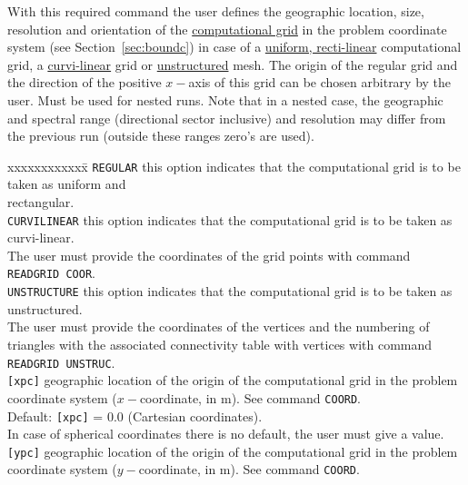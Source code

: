 \documentclass[12pt]{book}
\begin{document}
\noindent
With this required command the user defines the geographic location, size, resolution and orientation of
the \underline{computational grid} in the problem coordinate system (see Section~\ref{sec:boundc}) in
case of a \underline{uniform, recti-linear} computational grid, a \underline{curvi-linear} grid or
\underline{unstructured} mesh.
The origin of the regular grid and the direction of the positive $x-$axis of this grid
can be chosen arbitrary by the user. Must be used for nested runs. Note that in a nested case, the
geographic and spectral range (directional sector inclusive) and resolution may differ from the previous
run (outside these ranges zero's are used).
\begin{tabbing}
xxxxxxxxxxxx\= \kill
{\tt REGULAR}     \> this option indicates that the computational grid is to be taken as uniform and\+\\
                     rectangular.\-\\
{\tt CURVILINEAR} \> this option indicates that the computational grid is to be taken as curvi-linear.\+\\
                     The user must provide the coordinates of the grid points with command\\
                     {\tt READGRID COOR}.\-\\
{\tt UNSTRUCTURE} \> this option indicates that the computational grid is to be taken as unstructured.\+\\
                     The user must provide the coordinates of the vertices and the numbering of\\
                     triangles with the associated connectivity table with vertices with command\\
                     {\tt READGRID UNSTRUC}.\-\\
{\tt [xpc]}       \> geographic location of the origin of the computational grid in the problem\+\\
                     coordinate system ($x-$coordinate, in m). See command {\tt COORD}.\\
                     Default: {\tt [xpc]} = 0.0 (Cartesian coordinates).\\
                     In case of spherical coordinates there is no default, the user must give a value.\-\\
{\tt [ypc]}       \> geographic location of the origin of the computational grid in the problem\+\\
                     coordinate system ($y-$coordinate, in m). See command {\tt COORD}.\\

\end{tabbing}
\end{document}
